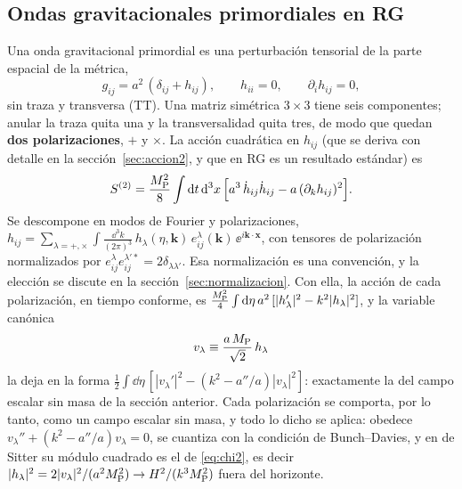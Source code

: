\subsection{Ondas gravitacionales primordiales en RG}
\label{sec:GW-RG}

Una onda gravitacional primordial es una perturbación tensorial de la parte espacial de la métrica,
\begin{equation}
g_{ij}=a^2\,(\delta_{ij}+h_{ij}),\qquad h_{ii}=0,\qquad \partial_ih_{ij}=0,
\label{eq:hij}
\end{equation}
sin traza y transversa (TT). Una matriz simétrica $3\times3$ tiene seis componentes; anular la traza quita una y la transversalidad quita tres, de modo que quedan \textbf{dos polarizaciones}, $+$ y $\times$. La acción cuadrática en $h_{ij}$ (que se deriva con detalle en la sección~\ref{sec:accion2}, y que en RG es un resultado estándar) es
\begin{equation}
S^{(2)}=\frac{M_{\rm P}^2}{8}\int\mathrm d t\,\mathrm d^3x\,\Big[a^3\,\dot h_{ij}\dot h_{ij}-a\,(\partial_kh_{ij})^2\Big].
\label{eq:S2RG}
\end{equation}
Se descompone en modos de Fourier y polarizaciones, $h_{ij}=\sum_{\lambda=+,\times}\int\!\frac{\dd^3k}{(2\pi)^3}\,h_\lambda(\eta,\mathbf k)\,e^\lambda_{ij}(\mathbf k)\,\ee^{i\mathbf k\cdot\mathbf x}$, con tensores de polarización normalizados por $e^\lambda_{ij}e^{\lambda'*}_{ij}=2\delta_{\lambda\lambda'}$. Esa normalización es una convención, y la elección se discute en la sección~\ref{sec:normalizacion}. Con ella, la acción de cada polarización, en tiempo conforme, es $\frac{M_{\rm P}^2}{4}\int\mathrm d\eta\,a^2\,[|h_\lambda'|^2-k^2|h_\lambda|^2]$, y la variable canónica
\begin{equation}
v_\lambda\equiv\frac{a\,M_{\rm P}}{\sqrt2}\,h_\lambda
\label{eq:vcanon}
\end{equation}
la deja en la forma $\tfrac12\int\dd\eta\,[|v_\lambda'|^2-(k^2-a''/a)|v_\lambda|^2]$: exactamente la del campo escalar sin masa de la sección anterior. Cada polarización se comporta, por lo tanto, como un campo escalar sin masa, y todo lo dicho se aplica: obedece $v_\lambda''+(k^2-a''/a)v_\lambda=0$, se cuantiza con la condición de Bunch--Davies, y en de Sitter su módulo cuadrado es el de \eqref{eq:chi2}, es decir $|h_\lambda|^2=2|v_\lambda|^2/(a^2M_{\rm P}^2)\to H^2/(k^3M_{\rm P}^2)$ fuera del horizonte.

